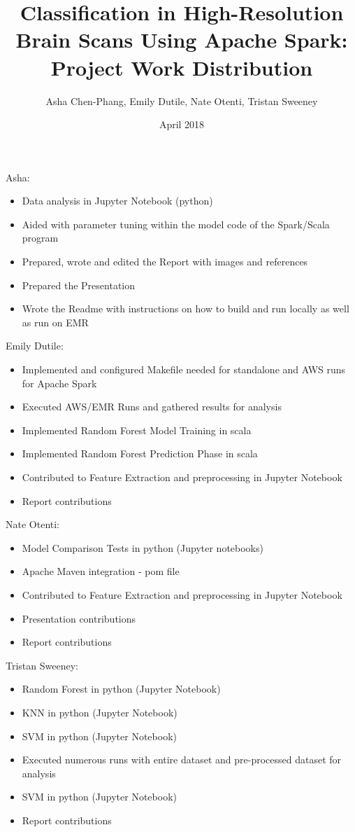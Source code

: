 \documentclass{neu_handout}
\title{Classification in High-Resolution Brain Scans Using Apache Spark: Project Work Distribution}
\author{Asha Chen-Phang, Emily Dutile, Nate Otenti, Tristan Sweeney}
\date{April 2018}
\begin{document}
\newenvironment{myitemize}
{ \begin{itemize}
    \setlength{\itemsep}{0pt}
    \setlength{\parskip}{0pt}
    \setlength{\parsep}{0pt}     }
{ \end{itemize}                  } 

Asha:
\begin{myitemize}
  \item Data analysis in Jupyter Notebook (python)
   \item Aided with parameter tuning within the model code of the Spark/Scala program
  \item Prepared, wrote and edited the Report with images and references
  \item Prepared the Presentation
   \item Wrote the Readme with instructions on how to build and run locally as well as run on EMR
\end{myitemize}

Emily Dutile:
\begin{myitemize}
  \item Implemented and configured Makefile needed for standalone and AWS runs for Apache Spark
  \item Executed AWS/EMR Runs and gathered results for analysis
  \item Implemented Random Forest Model Training in scala
  \item Implemented Random Forest Prediction Phase in scala
\item Contributed to Feature Extraction and preprocessing in Jupyter Notebook
  \item Report contributions
\end{myitemize}

Nate Otenti:
\begin{myitemize}
  \item Model Comparison Tests in python (Jupyter notebooks)
   \item Apache Maven integration - pom file
    \item Contributed to Feature Extraction and preprocessing in Jupyter Notebook
   \item Presentation contributions
  \item Report contributions
\end{myitemize}

Tristan Sweeney:
\begin{myitemize}
  \item Random Forest in python (Jupyter Notebook)
  \item KNN in python (Jupyter Notebook)
  \item SVM in python (Jupyter Notebook)
  \item Executed numerous runs with entire dataset and pre-processed dataset for analysis
  \item SVM in python (Jupyter Notebook)
  \item Report contributions
\end{myitemize}
\end{document}
